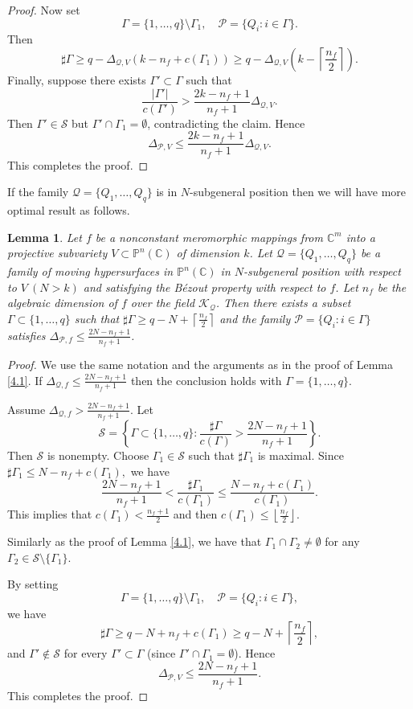 \documentclass[12pt,leqno]{amsart}
\newtheorem{lemma}[equation]{Lemma}
\newcommand{\C}{{\mathbb{C}}}
\renewcommand{\P}{{\mathbb{P}}}
\numberwithin{equation}{section}
\begin{document}
\begin{proof}
Now set
$$\Gamma = \{1,\ldots,q\} \setminus \Gamma_1, \quad \mathcal{P} = \{Q_i : i \in \Gamma\}.$$
Then
$$\sharp\Gamma\ge q -\Delta_{\mathcal Q,V}\left(k-n_f+c(\Gamma_1)\right)\ge q -\Delta_{\mathcal Q,V}\left(k-\left\lceil\frac{n_f}{2}\right\rceil\right).$$
Finally, suppose there exists $\Gamma' \subset \Gamma$ such that
$$
\frac{|\Gamma'|}{c(\Gamma')} > \frac{2k-n_f+1}{n_f+1}\Delta_{\mathcal Q,V}.
$$
Then $\Gamma' \in \mathcal{S}$ but $\Gamma' \cap \Gamma_1 = \emptyset$, contradicting the claim. 
Hence
$$\Delta_{\mathcal P,V}\le \frac{2k-n_f+1}{n_f+1}\Delta_{\mathcal Q,V}.$$
This completes the proof.
\end{proof}

If the family $\mathcal{Q} = \{Q_1, \ldots, Q_q\}$ is in $N$-subgeneral position then we will have more optimal result as follows. 
\begin{lemma}\label{4.2}
Let $f$ be a nonconstant meromorphic mappings from $\C^m$ into a projective subvariety $V\subset\P^n(\C)$ of dimension $k$. Let $\mathcal{Q} = \{Q_1, \ldots, Q_q\}$ be a family of moving hypersurfaces in $\P^n(\C)$ in $N$-subgeneral position with respect to $V\ (N> k)$ and satisfying the B\'ezout property with respect to $f$. Let $n_f$ be the algebraic dimension of $f$ over the field $\mathcal K_{\mathcal Q}$. Then there exists a subset $\Gamma \subset \{1,\ldots,q\}$ such that $\sharp\Gamma\ge q -N+\left\lceil\frac{n_f}{2}\right\rceil$ and the family $\mathcal P= \{Q_i : i \in \Gamma\}$ satisfies $\Delta_{\mathcal P,f}\le \frac{2N-n_f+1}{n_f+1}$.
\end{lemma}

\begin{proof} 
We use the same notation and the arguments as in the proof of Lemma \ref{4.1}. If $\Delta_{\mathcal Q,f}\le \frac{2N-n_f+1}{n_f+1}$ then the conclusion holds with $\Gamma = \{1,\ldots,q\}$.

Assume $\Delta_{\mathcal Q,f}>\frac{2N-n_f+1}{n_f+1}$. Let
$$\mathcal{S} = \left\{ \Gamma \subset \{1,\ldots,q\} : \frac{\sharp\Gamma}{c(\Gamma)} >\frac{2N-n_f+1}{n_f+1}\right\}.$$
Then $\mathcal{S}$ is nonempty. Choose $\Gamma_1 \in \mathcal{S}$ such that $\sharp\Gamma_1$ is maximal. Since 
$\sharp\Gamma_1\le N-n_f+c(\Gamma_1),$
we have
$$\frac{2N-n_f+1}{n_f+1}<\frac{\sharp\Gamma_1}{c(\Gamma_1)}\le \frac{N-n_f+c(\Gamma_1)}{c(\Gamma_1)}.$$
This implies that $c(\Gamma_1)<\frac{n_f+1}{2}$ and then $c(\Gamma_1)\le \left\lfloor\frac{n_f}{2}\right\rfloor$.

Similarly as the proof of Lemma \ref{4.1}, we have that $\Gamma_1 \cap \Gamma_2 \ne \emptyset$ for any $\Gamma_2 \in \mathcal{S}\setminus\{\Gamma_1\}$.

By setting
$$\Gamma = \{1,\ldots,q\} \setminus \Gamma_1, \quad \mathcal{P} = \{Q_i : i \in \Gamma\},$$
we have
$$\sharp\Gamma\ge q -N+n_f+c(\Gamma_1)\ge q -N+\left\lceil\frac{n_f}{2}\right\rceil,$$
and $\Gamma'\not\in\mathcal S$ for every $\Gamma' \subset \Gamma$ (since $\Gamma' \cap \Gamma_1 = \emptyset$). Hence
$$\Delta_{\mathcal P,V}\le \frac{2N-n_f+1}{n_f+1}.$$
This completes the proof.
\end{proof}
\end{document}
